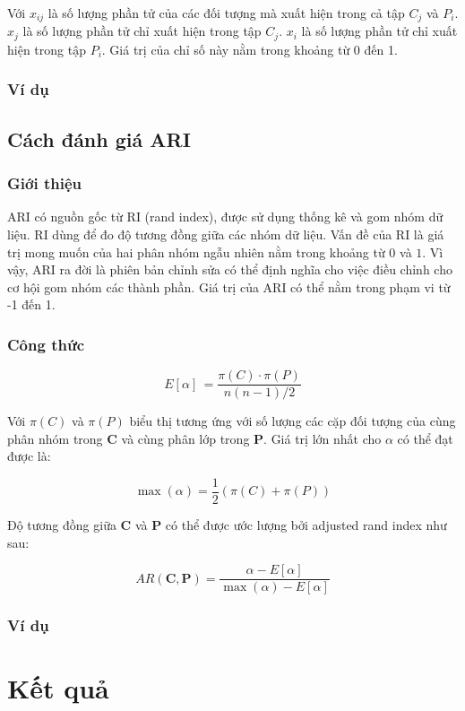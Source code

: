 		Với $x_{ij}$ là số lượng phần tử của các đối tượng mà xuất hiện trong cả tập $C_j$ và $P_i$. $x_j$ là số lượng phần tử chỉ xuất hiện trong tập $C_j$. $x_i$ là số lượng phần tử chỉ xuất hiện trong tập $P_i$. Giá trị của chỉ số này nằm trong khoảng từ 0 đến 1.

		\subsubsection{Ví dụ}
		
	\subsection{Cách đánh giá ARI}
		\subsubsection{Giới thiệu}
		ARI có nguồn gốc từ RI (rand index), được sử dụng thống kê và gom nhóm dữ liệu.
		RI dùng để đo độ tương đồng giữa các nhóm dữ liệu.
		Vấn đề của RI là giá trị mong muốn của hai phân nhóm ngẫu nhiên nằm trong khoảng từ $0$ và $1$.
		Vì vậy, ARI ra đời là phiên bản chỉnh sửa có thể định nghĩa cho việc điều chỉnh cho cơ hội gom nhóm các thành phần.
		Giá trị của ARI có thể nằm trong phạm vi từ -1 đến 1.

		\subsubsection{Công thức}
		\begin{center}
		\begin{equation}
			E[\alpha] \, = \frac{\pi(C) \cdot \pi(P)}{n(n - 1) / 2}
		\end{equation}
		\end{center}
		
		Với $\pi(C)$ và $\pi(P)$ biểu thị tương ứng với số lượng các cặp đối tượng của cùng phân nhóm trong $	\textbf{C}$ và cùng phân lớp trong $\textbf{P}$. Giá trị lớn nhất cho $\alpha$ có thể đạt được là:
		\begin{center}
		\begin{equation}
			\max(\alpha) = \frac{1}{2} (\pi(C) + \pi(P))
		\end{equation}
		\end{center}
		
		Độ tương đồng giữa $\textbf{C}$ và $\textbf{P}$ có thể được ước lượng bởi adjusted rand index như sau:
		\begin{center}
		\begin{equation}
			AR(\textbf{C}, \textbf{P}) = \frac{\alpha - E[\alpha]}{\max(\alpha) - E[\alpha]}
		\end{equation}
		\end{center}

		\subsubsection{Ví dụ}

\section{Kết quả}




